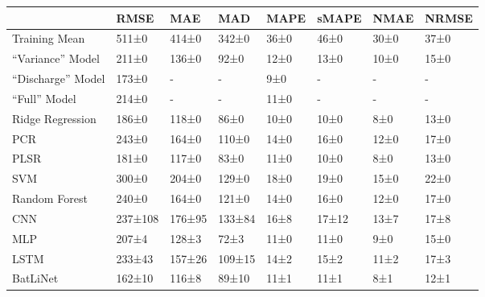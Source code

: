 \begin{tabular}{llllllll}
\toprule
 & RMSE & MAE & MAD & MAPE & sMAPE & NMAE & NRMSE \\
\midrule
Training Mean & 511±0 & 414±0 & 342±0 & 36±0 & 46±0 & 30±0 & 37±0 \\
``Variance'' Model & 211±0 & 136±0 & 92±0 & 12±0 & 13±0 & 10±0 & 15±0 \\
``Discharge'' Model & 173±0 & - & - & 9±0 & - & - & - \\
``Full'' Model & 214±0 & - & - & 11±0 & - & - & - \\
Ridge Regression & 186±0 & 118±0 & 86±0 & 10±0 & 10±0 & 8±0 & 13±0 \\
PCR & 243±0 & 164±0 & 110±0 & 14±0 & 16±0 & 12±0 & 17±0 \\
PLSR & 181±0 & 117±0 & 83±0 & 11±0 & 10±0 & 8±0 & 13±0 \\
SVM & 300±0 & 204±0 & 129±0 & 18±0 & 19±0 & 15±0 & 22±0 \\
Random Forest & 240±0 & 164±0 & 121±0 & 14±0 & 16±0 & 12±0 & 17±0 \\
CNN & 237±108 & 176±95 & 133±84 & 16±8 & 17±12 & 13±7 & 17±8 \\
MLP & 207±4 & 128±3 & 72±3 & 11±0 & 11±0 & 9±0 & 15±0 \\
LSTM & 233±43 & 157±26 & 109±15 & 14±2 & 15±2 & 11±2 & 17±3 \\
BatLiNet & 162±10 & 116±8 & 89±10 & 11±1 & 11±1 & 8±1 & 12±1 \\
\bottomrule
\end{tabular}

